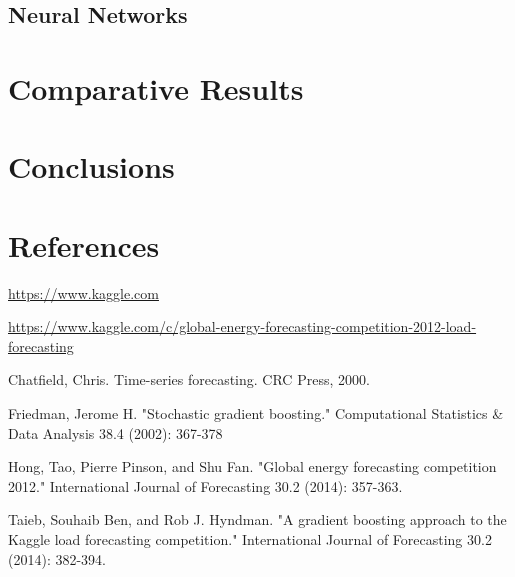 \documentclass{article} %
\begin{document}
\subsection*{Neural Networks}

\section*{Comparative Results}

\section*{Conclusions}


\section*{References}
\url{https://www.kaggle.com}

\url{https://www.kaggle.com/c/global-energy-forecasting-competition-2012-load-forecasting}

Chatfield, Chris. Time-series forecasting. CRC Press, 2000.

Friedman, Jerome H. "Stochastic gradient boosting." Computational Statistics \& Data Analysis 38.4 (2002): 367-378

Hong, Tao, Pierre Pinson, and Shu Fan. "Global energy forecasting competition 2012." International Journal of Forecasting 30.2 (2014): 357-363.

Taieb, Souhaib Ben, and Rob J. Hyndman. "A gradient boosting approach to the Kaggle load forecasting competition." International Journal of Forecasting 30.2 (2014): 382-394.
\end{document}
